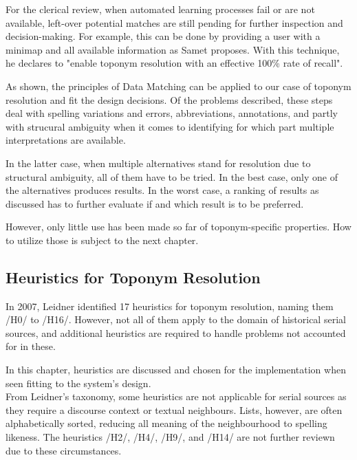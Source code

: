 \documentclass[11pt]{article}
\begin{document}
For the clerical review, when automated learning processes fail or are not available, left-over potential matches are still pending for further inspection and decision-making. For example, this can be done by providing a user with a minimap and all available information as Samet proposes. With this technique, he declares to "enable toponym resolution with an effective 100\% rate of recall". \cite{samet14}

As shown, the principles of Data Matching can be applied to our case of toponym resolution and fit the design decisions. Of the problems described, these steps deal with spelling variations and errors, abbreviations, annotations, and partly with strucural ambiguity when it comes to identifying for which part multiple interpretations are available.

In the latter case, when multiple alternatives stand for resolution due to structural ambiguity, all of them have to be tried. In the best case, only one of the alternatives produces results. In the worst case, a ranking of results as discussed has to further evaluate if and which result is to be preferred.

However, only little use has been made so far of toponym-specific properties. How to utilize those is subject to the next chapter.

\subsection{Heuristics for Toponym Resolution}

In 2007, Leidner identified 17 heuristics for toponym resolution, naming them /H0/ to /H16/. However, not all of them apply to the domain of historical serial sources, and additional heuristics are required to handle problems not accounted for in these.

In this chapter, heuristics are discussed and chosen for the implementation when seen fitting to the system's design.\\

From Leidner's taxonomy, some heuristics are not applicable for serial sources as they require a discourse context or textual neighbours. Lists, however, are often alphabetically sorted, reducing all meaning of the neighbourhood to spelling likeness. The heuristics /H2/, /H4/, /H9/, and /H14/ are not further reviewn due to these circumstances.\\
\end{document}
